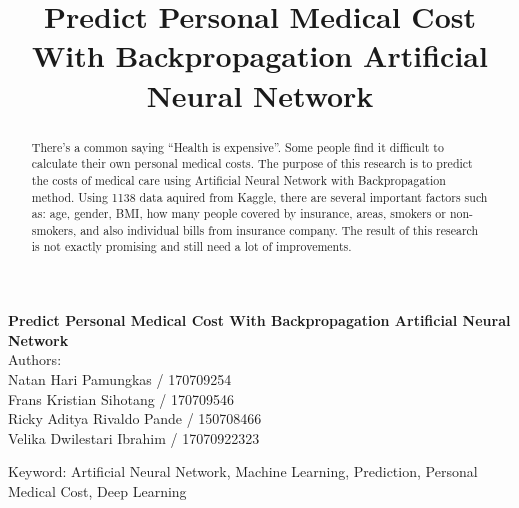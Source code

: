 \documentclass[a4paper, 12pt]{article}
\title{Predict Personal Medical Cost With Backpropagation Artificial Neural Network}
\date{}
\begin{document}
\centering
\textbf{\Large Predict Personal Medical Cost With Backpropagation Artificial Neural Network}\\
\vspace{0.5cm}
\small Authors:\\
\scriptsize Natan Hari Pamungkas / 170709254\\
\scriptsize Frans Kristian Sihotang / 170709546\\
\scriptsize Ricky Aditya Rivaldo Pande / 150708466\\
\scriptsize Velika Dwilestari Ibrahim / 17070922323\\

\begin{abstract}
There’s a common saying “Health is expensive”. Some people find it difficult to calculate their own personal medical costs. The purpose of this research is to predict the costs of medical care using Artificial Neural Network with Backpropagation method. Using 1138 data aquired from Kaggle, there are several important factors such as: age, gender, BMI, how many people covered by insurance, areas, smokers or non-smokers, and also individual bills from insurance company. The result of this research
is not exactly promising and still need a lot of improvements.\\
\end{abstract}

\scriptsize Keyword: Artificial Neural Network,  Machine Learning, Prediction, Personal Medical Cost, Deep Learning
\end{document}
